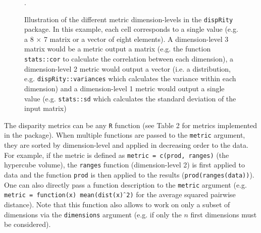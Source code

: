\documentclass[12pt,letterpaper]{article}
\newcommand{\disp}{\texttt{dispRity} }
\begin{document}
\begin{figure}[!htbp]
\centering
\caption{Illustration of the different metric dimension-levels in the \disp package. In this example, each cell corresponds to a single value (e.g. a 8 $\times$ 7 matrix or a vector of eight elements).
A dimension-level 3 matrix would be a metric output a matrix (e.g. the function \texttt{stats::cor} to calculate the correlation between each dimension), a dimension-level 2 metric would output a vector (i.e. a distribution, e.g. \texttt{dispRity::variances} which calculates the variance within each dimension) and a dimension-level 1 metric would output a single value (e.g. \texttt{stats::sd} which calculates the standard deviation of the input matrix)}.
\label{Fig:levels}
\end{figure}

The disparity metrics can be any \texttt{R} function (see Table 2 for metrics implemented in the package).
When multiple functions are passed to the \texttt{metric} argument, they are sorted by dimension-level and applied in decreasing order to the data.
For example, if the metric is defined as \texttt{metric = c(prod, ranges)} (the hypercube volume), the \texttt{ranges} function (dimension-level 2) is first applied to data and the function \texttt{prod} is then applied to the results (\texttt{prod(ranges(data))}).
One can also directly pass a function description to the \texttt{metric} argument (e.g. \texttt{metric = function(x) mean(dist(x)$\hat{\mkern6mu}$2)} for the average squared pairwise distance).
Note that this function also allows to work on only a subset of dimensions via the \texttt{dimensions} argument (e.g. if only the $n$ first dimensions must be considered).
\end{document}
